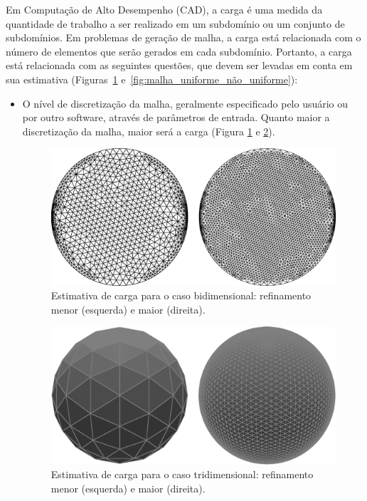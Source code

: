 Em Computação de Alto Desempenho (CAD), a carga é uma medida da quantidade de trabalho a ser realizado em um subdomínio ou um conjunto de subdomínios. Em problemas de geração de malha, a carga está relacionada com o número de elementos que serão gerados em cada subdomínio. Portanto, a carga está relacionada com as seguintes questões, que devem ser levadas em conta em sua estimativa (Figuras~\ref{fig:malha_norma_refinada} e~\ref{fig:malha_uniforme_não_uniforme}):

\begin{itemize}
	\item O nível de discretização da malha, geralmente especificado pelo usuário ou por outro software, através de parâmetros de entrada. Quanto maior a discretização da malha, maior será a carga (Figura \ref{fig:malha_norma_refinada} e \ref{fig:malha_norma_refinada_trid}).

\begin{figure}[!ht]
	\centering
	\includegraphics[width=1.0\textwidth]{fig/meshes_normal_and_refined.png}
	\caption{Estimativa de carga para o caso bidimensional: refinamento menor (esquerda) e maior (direita).}
	\label{fig:malha_norma_refinada}
\end{figure}

\begin{figure}[!ht]
	\centering
	\includegraphics[width=1.0\textwidth]{fig/esferas_comp_ref.png}
	\caption{Estimativa de carga para o caso tridimensional: refinamento menor (esquerda) e maior (direita).}
	\label{fig:malha_norma_refinada_trid}
\end{figure}


\end{itemize}
